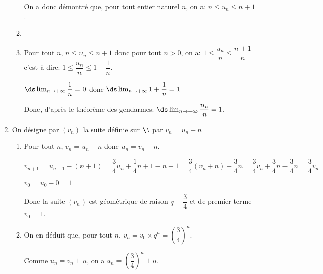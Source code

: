 \begin{enumerate}[resume]
\begin{enumerate}
On a donc démontré que, pour tout entier naturel $n$, on a: $n \leqslant u_n \leqslant n + 1$.
		
		\item%
		
		
		\item%
Pour tout $n$, $n\leqslant u_n \leqslant n+1$ donc pour tout $n>0$, on a:
$1 \leqslant \dfrac{u_n}{n} \leqslant \dfrac{n+1}{n}$ c'est-à-dire: 
$1 \leqslant \dfrac{u_n}{n} \leqslant 1+\dfrac{1}{n}$.

$\ds\lim_{n \to +\infty} \dfrac{1}{n}=0$ donc $\ds\lim_{n \to +\infty} 1+\dfrac{1}{n}=1$

Donc, d'après le théorème des gendarmes: $\ds\lim_{n\to +\infty} \dfrac{u_n}{n}=1$.

	\end{enumerate}
\item  On désigne par $\left(v_n\right)$ la suite définie sur $\N$ par $v_n = u_n - n$
	\begin{enumerate}
		\item%
Pour tout $n$, $v_n=u_n-n$ donc $u_n=v_n+n$.

$v_{n+1}=u_{n+1} - (n+1) = 	\dfrac{3}{4}u_n + \dfrac{1}{4}n+1 -n-1
=\dfrac{3}{4}\left (v_n+n\right ) -\dfrac{3}{4}n
=\dfrac{3}{4}v_n +\dfrac{3}{4}n -\dfrac{3}{4}n
=\dfrac{3}{4}v_n$

$v_0=u_0-0=1$

Donc la suite $(v_n)$ est géométrique de raison $q=\dfrac{3}{4}$ et de premier terme $v_0=1$.
		
		
		\item %
On en déduit que, pour tout $n$, $v_n=v_0\times q^n = \left (\dfrac{3}{4}\right )^n$.

Comme $u_n=v_n+n$, on a $u_n=\left (\dfrac{3}{4}\right )^n + n$.		
		
	\end{enumerate}
\end{enumerate}

\bigskip

